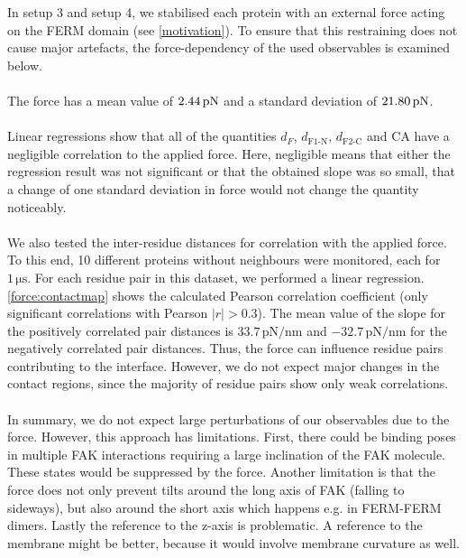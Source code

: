 \label{forceana}
In setup 3 and setup 4, we stabilised each protein with an external force acting on the FERM domain (see \autoref{motivation}). To ensure that this restraining does not cause major artefacts, the force-dependency of the used observables is examined below.\\
\\
The force has a mean value of $2.44\,\forceunit$ and a standard deviation of $21.80\,\forceunit$.\\
\\
Linear regressions show that all of the quantities $d_F$, $d_\text{F1-N}$, $d_\text{F2-C}$ and CA have a negligible correlation to the applied force. Here, negligible means that either the regression result was not significant or that the obtained slope was so small, that a change of one standard deviation in force would not change the quantity noticeably.\\
\\
We also tested the inter-residue distances for correlation with the applied force. To this end, 10 different proteins without neighbours were monitored, each for $1\,\si{\micro\second}$. For each residue pair in this dataset, we performed a linear regression. \autoref{force:contactmap} shows the calculated Pearson correlation coefficient (only significant correlations with Pearson $\left|r\right| > 0.3$). The mean value of the slope for the positively correlated pair distances is $33.7\,\si{\pico\newton/\nano\metre}$ and $-32.7\,\si{\pico\newton/\nano\metre}$ for the negatively correlated pair distances. Thus, the force can influence residue pairs contributing to the interface. However, we do not expect major changes in the contact regions, since the majority of residue pairs show only weak correlations.\\
\\
In summary, we do not expect large perturbations of our observables due to the force. However, this approach has limitations. First, there could be binding poses in multiple FAK interactions requiring a large inclination of the FAK molecule. These states would be suppressed by the force. Another limitation is that the force does not only prevent tilts around the long axis of FAK (falling to sideways), but also around the short axis which happens e.g. in FERM-FERM dimers. Lastly the reference to the z-axis is problematic. A reference to the membrane might be better, because it would involve membrane curvature as well.
